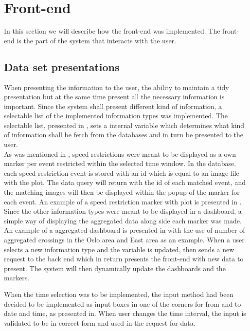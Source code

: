 
\section{Front-end} %
\label{sec:front_end}
In this section we will describe how the front-end was implemented. The
front-end is the part of the system that interacts with the user.

\subsection{Data set presentations} %
\label{sub:front_end_data_set_presentation}
When presenting the information to the user, the ability to maintain a tidy
presentation but at the same time present all the necessary information is 
important. Since the system shall present different kind of information, a 
selectable list of the implemented information types was implemented. The 
selectable list, presented in , sets a 
internal variable which determines what kind of information shall be fetch 
from the databases and in turn be presented to the user.\\

As was mentioned in , speed restrictions were
meant to be displayed as a own marker per event restricted within the selected
time window. In the database, each speed restriction event is stored with an id
which is equal to an image file with the plot. The data query will return with 
the id of each matched event, and the matching images will then be displayed
within the popup of the marker for each event. An example of a speed 
restriction marker with plot is presented in .\\


Since the other information types were meant to be displayed in a dashboard, a
simple way of displaying the aggregated data along side each marker was made.
An example of a aggregated dashboard is presented in  with the use of number of aggregated crossings in the Oslo area and East area as an example. When a user selects a new information type and the variable is updated, then sends a new request to the back end which in return presents the front-end with new data to present. The system will then dynamically update the dashboards and the markers.

When the time selection was to be implemented, the input method had been
decided to be implemented as input boxes in one of the corners for from and to 
date and time, as presented in. When user 
changes the time interval, the input is validated to be in correct form and 
used in the request for data.\\

